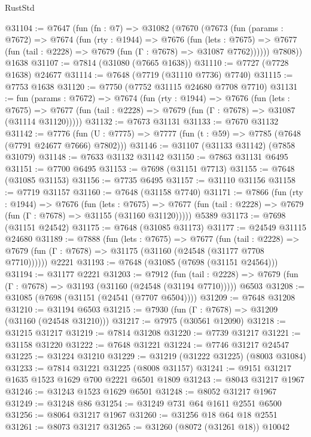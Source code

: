 \begin{lexlean}{RustStd}
\begin{coremodule}
{\begin{coremodule}
{{{{{{{{{{{{{{{{{{{{{{{{{{{{{{{{{{{{{{{{{{{{{{{{{{{{{@31104 := @7647
    (fun (fn : @7) =>
    @31082
      (@7670
        (@7673
          (fun (params : @7672) =>
          @7674
            (fun (rty : @1944) =>
            @7676
              (fun (lets : @7675) =>
              @7677 (fun (tail : @2228) => @7679 (fun (Γ : @7678) => @31087 @7762))))))
        @7808))
    @1638
@31107 := @7814 (@31080 (@7665 @1638))
@31110 := @7727 (@7728 @1638) @24677
@31114 := @7648 (@7719 (@31110 @7736) @7740)
@31115 := @7753 @1638
@31120 := @7750 (@7752 @31115 @24680 @7708 @7710)
@31131 := fun (params : @7672) =>
  @7674
    (fun (rty : @1944) =>
    @7676
      (fun (lets : @7675) =>
      @7677 (fun (tail : @2228) => @7679 (fun (Γ : @7678) => @31087 (@31114 @31120)))))
@31132 := @7673 @31131
@31133 := @7670 @31132
@31142 := @7776
    (fun (U : @7775) => @7777 (fun (t : @59) => @7785 (@7648 (@7791 @24677 @7666) @7802)))
@31146 := @31107 (@31133 @31142) (@7858 @31079)
@31148 := @7633 @31132 @31142
@31150 := @7863 @31131 @6495
@31151 := @7700 @6495
@31153 := @7698 (@31151 @7713)
@31155 := @7648 (@31085 @31153)
@31156 := @7735 @6495
@31157 := @31110 @31156
@31158 := @7719 @31157
@31160 := @7648 (@31158 @7740)
@31171 := @7866
    (fun (rty : @1944) =>
    @7676
      (fun (lets : @7675) =>
      @7677 (fun (tail : @2228) => @7679 (fun (Γ : @7678) => @31155 (@31160 @31120)))))
    @5389
@31173 := @7698 (@31151 @24542)
@31175 := @7648 (@31085 @31173)
@31177 := @24549 @31115 @24680
@31189 := @7888
    (fun (lets : @7675) =>
    @7677
      (fun (tail : @2228) =>
      @7679 (fun (Γ : @7678) => @31175 (@31160 (@24548 (@31177 @7708 @7710))))))
    @2221
@31193 := @7648 (@31085 (@7698 (@31151 @24564)))
@31194 := @31177 @2221
@31203 := @7912
    (fun (tail : @2228) => @7679 (fun (Γ : @7678) => @31193 (@31160 (@24548 (@31194 @7710)))))
    @6503
@31208 := @31085 (@7698 (@31151 (@24541 (@7707 @6504))))
@31209 := @7648 @31208
@31210 := @31194 @6503
@31215 := @7930 (fun (Γ : @7678) => @31209 (@31160 (@24548 @31210)))
@31217 := @7975 (@30561 @12090)
@31218 := @31215 @31217
@31219 := @7814 @31208
@31220 := @7739 @31217
@31221 := @31158 @31220
@31222 := @7648 @31221
@31224 := @7746 @31217 @24547
@31225 := @31224 @31210
@31229 := @31219 (@31222 @31225) (@8003 @31084)
@31233 := @7814 @31221 @31225 (@8008 @31157)
@31241 := @9151 @31217 @1635 @1523 @1629 @700 @2221 @6501 @1809
@31243 := @8043 @31217 @1967
@31246 := @31243 @1523 @1629 @6501
@31248 := @8052 @31217 @1967
@31249 := @31248 @86
@31254 := @31249 @731 @64 @1611 @2551 @6500
@31256 := @8064 @31217 @1967
@31260 := @31256 @18 @64 @18 @2551
@31261 := @8073 @31217
@31265 := @31260 (@8072 (@31261 @18)) @10042
}}}}}}}}}}}}}}}}}}}}}}}}}}}}}}}}}}}}}}}}}}}}}}}}}}}}}
\end{coremodule}}
\end{coremodule}
\end{lexlean}
